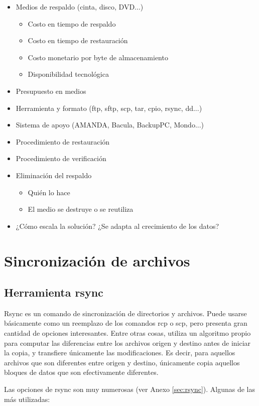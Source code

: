 \begin{itemize}
\begin{itemize}
	\end{itemize}
	\item Medios de respaldo (cinta, disco, DVD...)
	\begin{itemize}
		\item Costo en tiempo de respaldo
		\item Costo en tiempo de restauración
		\item Costo monetario por byte de almacenamiento 
		\item Disponibilidad tecnológica
	\end{itemize}
	\item Presupuesto en medios
	\item Herramienta y formato (ftp, sftp, scp, tar, cpio, rsync, dd...)  
	\item Sistema de apoyo (AMANDA, Bacula, BackupPC, Mondo...)
	\item Procedimiento de restauración
	\item Procedimiento de verificación
	\item Eliminación del respaldo
	\begin{itemize}
		\item Quién lo hace
		\item El medio se destruye o se reutiliza 
	\end{itemize}
	\item ¿Cómo escala la solución? ¿Se adapta al crecimiento de los datos?
\end{itemize}

\section{Sincronización de archivos}

\subsection{Herramienta rsync}

Rsync es un comando de sincronización de directorios y archivos. Puede usarse básicamente como un reemplazo de los comandos rcp o scp, pero presenta gran cantidad de opciones interesantes. Entre otras cosas, utiliza un algoritmo propio para computar las diferencias entre los archivos origen y destino antes de iniciar la copia, y transfiere únicamente las modificaciones. Es decir, para aquellos archivos que son diferentes entre origen y destino, únicamente copia aquellos bloques de datos que son efectivamente diferentes.  

Las opciones de rsync son muy numerosas (ver Anexo \ref{sec:rsync}). Algunas de las más utilizadas:


